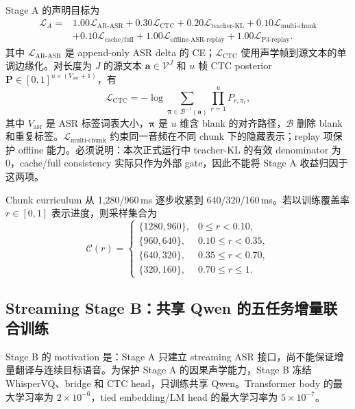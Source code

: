 \documentclass[11pt,a4paper]{article}
\newcommand{\vect}[1]{\bm{#1}}
\newcommand{\mat}[1]{\bm{#1}}
\newcommand{\Vocab}{\mathcal{V}}
\newcommand{\Loss}{\mathcal{L}}
\begin{document}
Stage A 的声明目标为
\begin{align}
 \Loss_A={}&1.00\Loss_{\mathrm{AR\text{-}ASR}}
 +0.30\Loss_{\mathrm{CTC}}
 +0.20\Loss_{\mathrm{teacher\text{-}KL}}
 +0.10\Loss_{\mathrm{multi\text{-}chunk}}\nonumber\\
 &+0.10\Loss_{\mathrm{cache/full}}
 +1.00\Loss_{\mathrm{offline\text{-}ASR\text{-}replay}}
 +1.00\Loss_{\mathrm{P3\text{-}replay}}.
 \label{eq:stagea}
\end{align}
其中 $\Loss_{\mathrm{AR\text{-}ASR}}$ 是 append-only ASR delta 的 CE；$\Loss_{\mathrm{CTC}}$ 使用声学帧到源文本的单调边缘化。对长度为 $J$ 的源文本 $\vect{a}\in\Vocab^J$ 和 $u$ 帧 CTC posterior $\mat{P}\in[0,1]^{u\times(V_{\mathrm{asr}}+1)}$，有
\begin{equation}
 \Loss_{\mathrm{CTC}}=-\log\sum_{\vect{\pi}\in\mathcal{B}^{-1}(\vect{a})}
 \prod_{r=1}^{u}P_{r,\pi_r},
 \label{eq:ctc}
\end{equation}
其中 $V_{\mathrm{asr}}$ 是 ASR 标签词表大小，$\vect{\pi}$ 是 $u$ 维含 blank 的对齐路径，$\mathcal{B}$ 删除 blank 和重复标签。$\Loss_{\mathrm{multi\text{-}chunk}}$ 约束同一音频在不同 chunk 下的隐藏表示；replay 项保护 offline 能力。必须说明：本次正式运行中 teacher-KL 的有效 denominator 为 0，cache/full consistency 实际只作为外部 gate，因此不能将 Stage A 收益归因于这两项。

Chunk curriculum 从 1,280/960\,ms 逐步收紧到 640/320/160\,ms。若以训练覆盖率 $r\in[0,1]$ 表示进度，则采样集合为
\begin{equation}
 \mathcal{C}(r)=
 \begin{cases}
 \{1280,960\}, & 0\le r<0.10,\\
 \{960,640\}, & 0.10\le r<0.35,\\
 \{640,320\}, & 0.35\le r<0.70,\\
 \{320,160\}, & 0.70\le r\le1.
 \end{cases}
 \label{eq:chunkcurr}
\end{equation}

\subsection{Streaming Stage B：共享 Qwen 的五任务增量联合训练}

Stage B 的 motivation 是：Stage A 只建立 streaming ASR 接口，尚不能保证增量翻译与连续目标语音。为保护 Stage A 的因果声学能力，Stage B 冻结 WhisperVQ、bridge 和 CTC head，只训练共享 Qwen。Transformer body 的最大学习率为 $2\times10^{-6}$，tied embedding/LM head 的最大学习率为 $5\times10^{-7}$。
\end{document}

